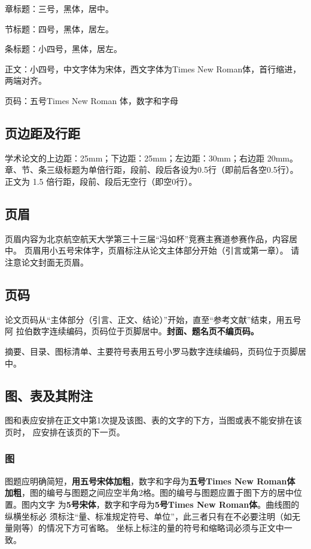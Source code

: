 \documentclass[zihao=-4]{ctexart}
\begin{document}
\begin{spacing}{1.5}
章标题：三号，黑体，居中。

节标题：四号，黑体，居左。

条标题：小四号，黑体，居左。

正文：小四号，中文字体为宋体，西文字体为Times New Roman体，首行缩进，两端对齐。

页码：五号Times New Roman 体，数字和字母\par

\subsection{页边距及行距}
学术论文的上边距：25mm；下边距：25mm；左边距：30mm；右边距 20mm。
章、节、条三级标题为单倍行距，段前、段后各设为0.5行（即前后各空0.5行）。
正文为 1.5 倍行距，段前、段后无空行（即空0行）。

\subsection{页眉}
页眉内容为北京航空航天大学第三十三届“冯如杯”竞赛主赛道参赛作品，内容居中。
页眉用小五号宋体字，页眉标注从论文主体部分开始（引言或第一章）。
请注意论文封面无页眉。

\subsection{页码}
论文页码从“主体部分（引言、正文、结论）”开始，直至“参考文献”结束，用五号阿
拉伯数字连续编码，页码位于页脚居中。\textbf{封面、题名页不编页码。}

摘要、目录、图标清单、主要符号表用五号小罗马数字连续编码，页码位于页脚居中。

\subsection{图、表及其附注}
图和表应安排在正文中第1次提及该图、表的文字的下方，当图或表不能安排在该页时，
应安排在该页的下一页。

\subsubsection{图}
图题应明确简短，\textbf{用五号宋体加粗}，数字和字母为\textbf{五号Times New Roman体
加粗}，图的编号与图题之间应空半角2格。图的编号与图题应置于图下方的居中位置。图内文字
为\textbf{5号宋体}，数字和字母为\textbf{5号Times New Roman体}。曲线图的纵横坐标必
须标注“量、标准规定符号、单位”，此三者只有在不必要注明（如无量刚等）的情况下方可省略。
坐标上标注的量的符号和缩略词必须与正文中一致。


\end{spacing}
\end{document}
